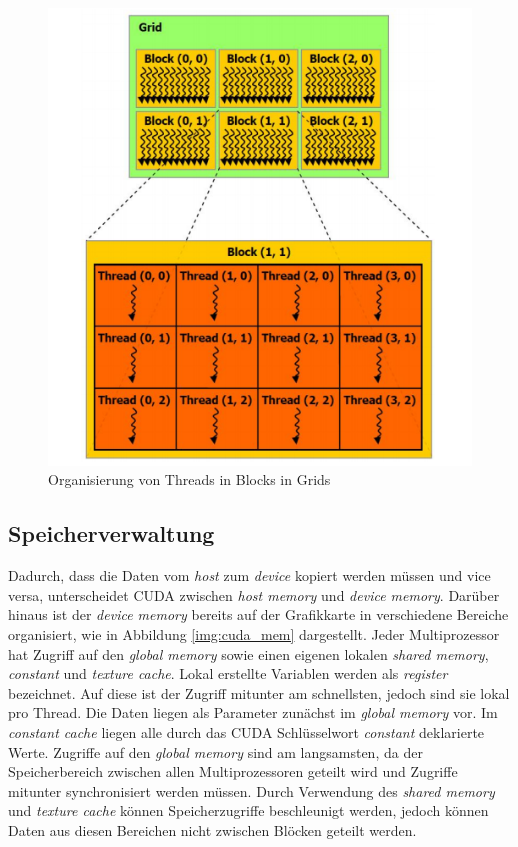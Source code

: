 \begin{figure}
	\centering
	\includegraphics[scale=0.55]{images/cuda1.png}
	\caption{Organisierung von Threads in Blocks in Grids \cite{cud2012}}
	\label{img:cuda1}
\end{figure}

\subsection{Speicherverwaltung}
\label{cudaMemory}

Dadurch, dass die Daten vom \textit{host} zum \textit{device} kopiert werden müssen und vice versa, unterscheidet CUDA zwischen \textit{host memory} und \textit{device memory}. Darüber hinaus ist der \textit{device memory} bereits auf der Grafikkarte in verschiedene Bereiche organisiert, wie in Abbildung \ref{img:cuda_mem} dargestellt. Jeder Multiprozessor hat Zugriff auf den \textit{global memory} sowie einen eigenen lokalen \textit{shared memory}, \textit{constant} und \textit{texture cache}. Lokal erstellte Variablen werden als \textit{register} bezeichnet. Auf diese ist der Zugriff mitunter am schnellsten, jedoch sind sie lokal pro Thread. Die Daten liegen als Parameter zunächst im \textit{global memory} vor. Im \textit{constant cache} liegen alle durch das CUDA Schlüsselwort \textit{\textunderscore\textunderscore constant\textunderscore\textunderscore} deklarierte Werte. Zugriffe auf den \textit{global memory} sind am langsamsten, da der Speicherbereich zwischen allen Multiprozessoren geteilt wird und Zugriffe mitunter synchronisiert werden müssen. Durch Verwendung des \textit{shared memory} und \textit{texture cache} können Speicherzugriffe beschleunigt werden, jedoch können Daten aus diesen Bereichen nicht zwischen Blöcken geteilt werden.

